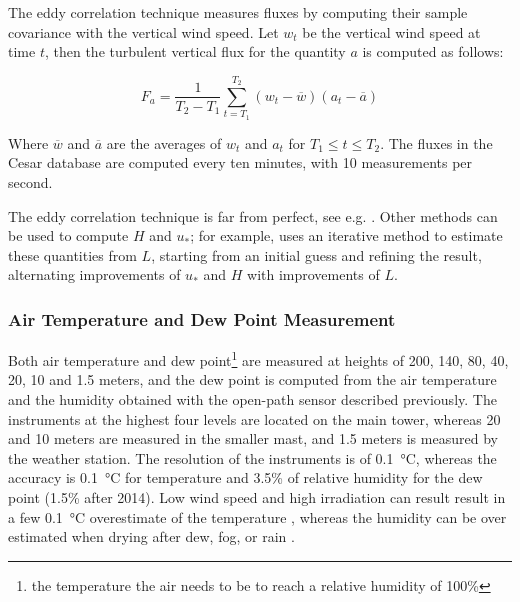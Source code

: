 \documentclass[a4paper]{book}
\begin{document}
The eddy correlation technique measures fluxes by computing their sample covariance with the vertical wind speed. Let $w_t$ be the vertical wind speed at time $t$, then the turbulent vertical flux for the quantity $a$ is computed as follows:

$$
F_a=\frac{1}{T_2-T_1}\sum_{t=T_1}^{T_2}(w_t-\overline{w})(a_t-\overline{a})
$$

Where $\overline{w}$ and $\overline{a}$ are the averages of $w_t$ and $a_t$ for $T_1\leq t\leq T_2$. The fluxes in the Cesar database are computed every ten minutes, with 10 measurements per second.

The eddy correlation technique is far from perfect, see e.g. \citep{microhandbook, ed_co2}. Other methods can be used to compute $H$ and $u_*$; for example, \cite{cabauw_abl} uses an iterative method to estimate these quantities from $L$, starting from an initial guess and refining the result, alternating improvements of $u_*$ and $H$ with improvements of $L$.

\subsubsection{Air Temperature and Dew Point Measurement}
Both air temperature and dew point\footnote{the temperature the air needs to be to reach a relative humidity of 100\%} are measured at heights of 200, 140, 80, 40, 20, 10 and 1.5 meters, and the dew point is computed from the air temperature and the humidity obtained with the open-path sensor described previously. The instruments at the highest four levels are located on the main tower, whereas 20 and 10 meters are measured in the smaller mast, and 1.5 meters is measured by the weather station. The resolution of the instruments is of \SI{0.1}{\celsius}, whereas the accuracy is \SI{0.1}{\celsius} for temperature and 3.5\% of relative humidity for the dew point (1.5\% after 2014). Low wind speed and high irradiation can result result in a few \SI{0.1}{\celsius} overestimate of the temperature \citep{tempoverestimate}, whereas the humidity can be over estimated when drying after dew, fog, or rain \citep{cabauwinsitu}.
\end{document}
